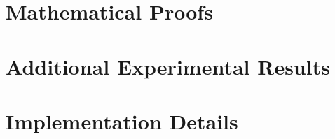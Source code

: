 \documentclass[conference]{IEEEtran}
\begin{document}



\appendix

\section{Mathematical Proofs}
\label{app:proofs}


\section{Additional Experimental Results}
\label{app:results}


\section{Implementation Details}
\label{app:implementation}

\end{document}
